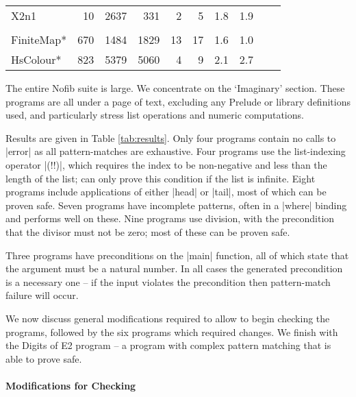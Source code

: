 \begin{table}
\begin{tabular*}{\linewidth}{lrrrrrrlll}
\hspace{-2mm} X2n1                         & 10 & 2637 &  331 & 2 &  5 & 1.8 & 1.9 \\
\vspace{-1ex} \\
\hspace{-2mm} FiniteMap*    \hspace{-3mm} & 670 & 1484 & 1829 & 13 & 17 & 1.6 & 1.0 \\
\hspace{-2mm} HsColour*     \hspace{-3mm} & 823 & 5379 & 5060 & 4 &  9 & 2.1 & 2.7 \\
\hline
\end{tabular*}
\figureend
\end{table}

The entire Nofib suite \citep{nofib} is large. We concentrate on the `Imaginary' section. These programs are all under a page of text, excluding any Prelude or library definitions used, and particularly stress list operations and numeric computations.

Results are given in Table \ref{tab:results}. Only four programs contain no calls to |error| as all pattern-matches are exhaustive. Four programs use the list-indexing operator |(!!)|, which requires the index to be non-negative and less than the length of the list; \catch{} can only prove this condition if the list is infinite. Eight programs include applications of either |head| or |tail|, most of which can be proven safe. Seven programs have incomplete patterns, often in a |where| binding and \catch{} performs well on these. Nine programs use division, with the precondition that the divisor must not be zero; most of these can be proven safe.

Three programs have preconditions on the |main| function, all of which state that the argument must be a natural number. In all cases the generated precondition is a necessary one -- if the input violates the precondition then pattern-match failure will occur.

We now discuss general modifications required to allow \catch{} to begin checking the programs, followed by the six programs which required changes. We finish with the Digits of E2 program -- a program with complex pattern matching that \catch{} is able to prove safe.

\paragraph{Modifications for Checking}

